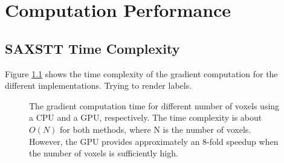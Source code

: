 \chapter{Computation Performance}





\section{SAXSTT Time Complexity}



Figure \ref{fig:gradient_time_complexity} shows the time complexity of the gradient computation for the different implementations. %
Trying to render labels.
\begin{figure}[h!]
    \centering
    
    \caption{ The gradient computation time for different number of voxels using a CPU and a GPU, respectively. %
        The time complexity is about $O(N)$ for both methods, where N is the number of voxels. However, the GPU provides approximately an 8-fold speedup when the number of voxels is sufficiently high.}
    \label{fig:gradient_time_complexity}
\end{figure}


